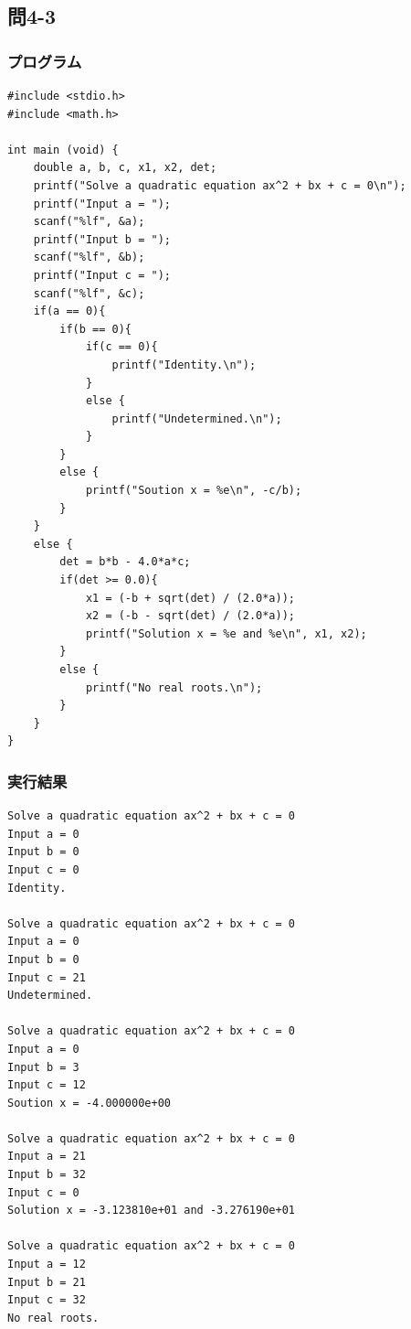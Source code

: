 \documentclass{jarticle}
\begin{document}
\subsection{問4-3\\}
\subsubsection{プログラム\\}
\begin{breakbox}
\begin{verbatim}
#include <stdio.h>
#include <math.h>

int main (void) { 
    double a, b, c, x1, x2, det;
    printf("Solve a quadratic equation ax^2 + bx + c = 0\n");
    printf("Input a = ");
    scanf("%lf", &a);
    printf("Input b = ");
    scanf("%lf", &b);
    printf("Input c = ");
    scanf("%lf", &c);
    if(a == 0){
        if(b == 0){
            if(c == 0){
                printf("Identity.\n");
            }
            else {
                printf("Undetermined.\n");
            }
        }
        else {
            printf("Soution x = %e\n", -c/b);
        }
    }
    else {
        det = b*b - 4.0*a*c;
        if(det >= 0.0){
            x1 = (-b + sqrt(det) / (2.0*a));
            x2 = (-b - sqrt(det) / (2.0*a));
            printf("Solution x = %e and %e\n", x1, x2);
        }
        else {
            printf("No real roots.\n");
        }
    }
}
\end{verbatim}
\end{breakbox}
\subsubsection{実行結果\\}
\begin{breakbox}
\begin{verbatim}
Solve a quadratic equation ax^2 + bx + c = 0
Input a = 0
Input b = 0
Input c = 0
Identity.

Solve a quadratic equation ax^2 + bx + c = 0
Input a = 0
Input b = 0
Input c = 21
Undetermined.

Solve a quadratic equation ax^2 + bx + c = 0
Input a = 0
Input b = 3 
Input c = 12
Soution x = -4.000000e+00

Solve a quadratic equation ax^2 + bx + c = 0
Input a = 21
Input b = 32
Input c = 0
Solution x = -3.123810e+01 and -3.276190e+01

Solve a quadratic equation ax^2 + bx + c = 0
Input a = 12
Input b = 21
Input c = 32
No real roots.
\end{verbatim}
\end{breakbox}
\end{document}
